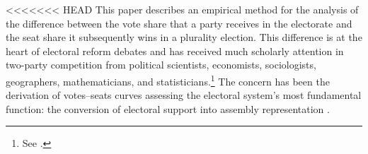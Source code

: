 \documentclass[letter,12pt]{article}
\begin{document}
<<<<<<< HEAD
\noindent This paper describes an empirical method for the analysis of the difference between the vote share that a party receives in the electorate and the seat share it subsequently wins in a plurality election. This difference is at the heart of electoral reform debates and has received much scholarly attention in two-party competition from political scientists, economists, sociologists, geographers, mathematicians, and statisticians.\footnote{See \citet{altman.mcdonald2011bard,balinskiYoung2001FairRep,brady.grofmanBiasResponsiveness1991,cain.partisanRedistricting.1985,cox.katz.2002,dahl.1956prefDemoc,engstrom2006redisttrictApsr,erikson1972malapportionment,gelman.king.1994EvalElSysRedis,grofmanBiasProportionality.1983,grofman.etalBiasMalapp.1997,gudgin.taylor.1980decomposeBias,johnston.2002,kendall.stuartCubeLaw1950,king.browning1987biasRespUS,niemi.fett1986swing,rae.1967,rossiter.etal.1997,taagepera.CubeLaw.1973,trelles.mtz.polygob2012,tufte1973seatsVotes}.\label{fn:cites}} The concern has been the derivation of votes--seats curves assessing the electoral system's most fundamental function: the conversion of electoral support into assembly representation \citep{lijphartElSysPtySys.1994}. 
\end{document}
